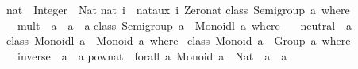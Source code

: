 \begin{isabellebody}
\begin{isamarkuptext}
\isanewline
nat\ {}{}\ Integer\ {}{}\ Nat{}\isanewline
nat\ i\ {}\ nat{}aux\ i\ Zero{}nat{}\isanewline
\isanewline
class\ Semigroup\ a\ where\ {}\isanewline
\ \ mult\ {}{}\ a\ {}{}\ a\ {}{}\ a{}\isanewline
{}{}\isanewline
\isanewline
class\ {}Semigroup\ a{}\ {}{}\ Monoidl\ a\ where\ {}\isanewline
\ \ neutral\ {}{}\ a{}\isanewline
{}{}\isanewline
\isanewline
class\ {}Monoidl\ a{}\ {}{}\ Monoid\ a\ where\ {}\isanewline
{}{}\isanewline
\isanewline
class\ {}Monoid\ a{}\ {}{}\ Group\ a\ where\ {}\isanewline
\ \ inverse\ {}{}\ a\ {}{}\ a{}\isanewline
{}{}\isanewline
\isanewline
pow{}nat\ {}{}\ forall\ a{}\ {}Monoid\ a{}\ {}{}\ Nat\ {}{}\ a\ {}{}\ a{}\isanewline

\end{isamarkuptext}
\end{isabellebody}
